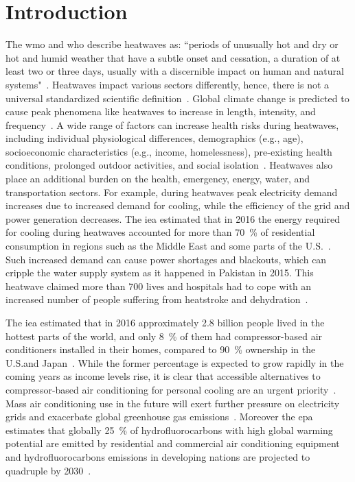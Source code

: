 
\section{Introduction}\label{sec:introduction}

The \ac{wmo} and \ac{who} describe heatwaves as: ``periods of unusually hot and dry or hot and humid weather that have a subtle onset and cessation, a duration of at least two or three days, usually with a discernible impact on human and natural systems"~\cite{WMO2015}.
Heatwaves impact various sectors differently, hence, there is not a universal standardized scientific definition~\cite{Perkins2013}.
Global climate change is predicted to cause peak phenomena like heatwaves to increase in length, intensity, and frequency~\cite{Whatharm75:online}.
A wide range of factors can increase health risks during heatwaves, including individual physiological differences, demographics (e.g., age), socioeconomic characteristics (e.g., income, homelessness), pre-existing health conditions, prolonged outdoor activities, and social isolation~\cite{WMO2015}.
Heatwaves also place an additional burden on the health, emergency, energy, water, and transportation sectors. 
For example, during heatwaves peak electricity demand increases due to increased demand for cooling, while the efficiency of the grid and power generation decreases.
The \ac{iea} estimated that in 2016 the energy required for cooling during heatwaves accounted for more than 70~\% of residential consumption in regions such as the Middle East and some parts of the U.S.~\cite{IEA2018}.
Such increased demand can cause power shortages and blackouts, which can cripple the water supply system as it happened in Pakistan in 2015.
This heatwave claimed more than 700 lives and hospitals had to cope with an increased number of people suffering from heatstroke and dehydration~\cite{Masood2015}.

The \ac{iea} estimated that in 2016 approximately 2.8 billion people lived in the hottest parts of the world, and only 8~\% of them had compressor-based air conditioners installed in their homes, compared to 90~\% ownership in the U.S.\@ and Japan~\cite{IEA2018}. 
While the former percentage is expected to grow rapidly in the coming years as income levels rise, it is clear that accessible alternatives to compressor-based air conditioning for personal cooling are an urgent priority~\cite{Davis2015}.
Mass air conditioning use in the future will exert further pressure on electricity grids and exacerbate global greenhouse gas emissions~\cite{IEA2018}.
Moreover the \ac{epa} estimates that globally 25~\% of hydrofluorocarbons with high global warming potential are emitted by residential and commercial air conditioning equipment and hydrofluorocarbons emissions in developing nations are projected to quadruple by 2030~\cite{Snap2016}.

